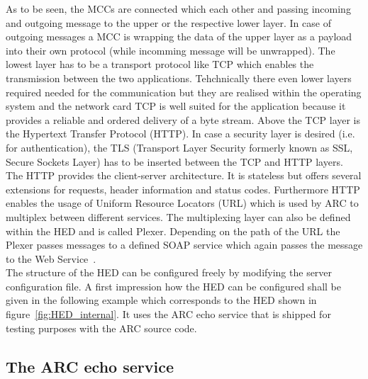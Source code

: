 As to be seen, the MCCs are connected which each other and passing incoming and outgoing message to the upper or the respective lower layer. In case of outgoing messages a MCC is wrapping the data of the upper layer as a payload into their own protocol (while incomming message will be unwrapped).
The lowest layer has to be a transport protocol like TCP which enables the transmission between the two applications.
Tehchnically there even lower layers required needed for the communication but they are realised within the operating system and the  network card
TCP is well suited for the application because it provides a reliable and ordered delivery of a byte stream.
Above the TCP layer is the Hypertext Transfer Protocol (HTTP). 
In case a security layer is desired (i.e. for authentication), the TLS (Transport Layer Security formerly known as SSL, Secure Sockets Layer) has to be inserted between the TCP and HTTP layers.
The HTTP provides the client-server architecture. It is stateless but offers several extensions for requests, header information and status codes. Furthermore HTTP enables the usage of Uniform Resource Locators (URL) which is used by ARC to multiplex between different services. The multiplexing layer can also be defined within the HED and is called Plexer.
Depending on the path of the URL the Plexer passes messages to a defined SOAP service which again passes the message to the Web Service~\cite{QIANG_2005}. \\


The structure of the HED can be configured freely by modifying the server configuration file.
A first impression how the HED can be configured shall be given in the following example which corresponds to the HED shown in figure~\ref{fig:HED_internal}.
It uses the ARC echo service that is shipped for testing purposes with the ARC source code.



\subsection{The ARC echo service}


